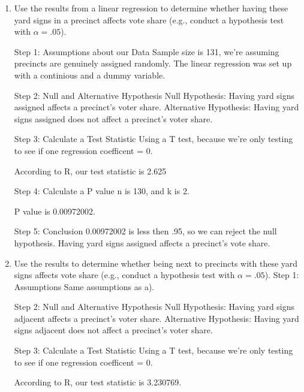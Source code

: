 \documentclass[12pt,letterpaper]{article}
\begin{document}
\vspace{.5cm}
\begin{enumerate}
	\item [(a)] Use the results from a linear regression to determine whether having these yard signs in a precinct affects vote share (e.g., conduct a hypothesis test with $\alpha = .05$).
	
	Step 1: Assumptions about our Data
	Sample size is 131, we're assuming precincts are genuinely assigned randomly. The linear regression was set up with a continious and a dummy variable.
	
	Step 2: Null and Alternative Hypothesis
	Null Hypothesis: Having yard signs assigned affects a precinct's voter share. 
	Alternative Hypothesis:  Having yard signs assigned does not affect a precinct's voter share.
		
	Step 3: Calculate a Test Statistic
	Using a T test, because we're only testing to see if one regression coefficent = 0.
	
	
	
	
	According to R, our test statistic is 2.625
	
	Step 4: Calculate a P value
	n is 130, and k is 2.
	
	
	
	P value is 0.00972002.
	
	Step 5: Conclusion
	0.00972002 is less then .95, so we can reject the null hypothesis. Having yard signs assigned affects a precinct's vote share.
	
	\newpage		
	\item [(b)]  Use the results to determine whether being
	next to precincts with these yard signs affects vote
	share (e.g., conduct a hypothesis test with $\alpha = .05$).
	Step 1: Assumptions
	Same assumptions as a).
	
	Step 2: Null and Alternative Hypothesis
	Null Hypothesis: Having yard signs adjacent affects a precinct's voter share. 
	Alternative Hypothesis:  Having yard signs adjacent does not affect a precinct's voter share.
	
	
	Step 3: Calculate a Test Statistic
	Using a T test, because we're only testing to see if one regression coefficent = 0.
	
	
	
	
	According to R, our test statistic is 3.230769.
	

\end{enumerate}
\end{document}
